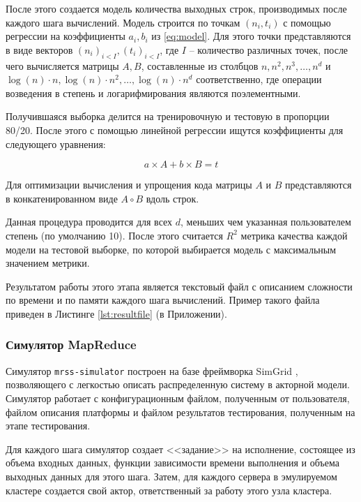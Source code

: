 \documentclass[../diploma.tex]{subfile}
\begin{document}
    После этого создается модель количества выходных строк, производимых после
    каждого шага вычислений. Модель строится по точкам $(n_i, t_i)$ с помощью
    регрессии на коэффициенты $a_i, b_i$ из \ref{eq:model}. Для этого точки
    представляются в виде векторов $(n_i)_{i < I}, (t_i)_{i < I}$, где $I$ --
    количество различных точек, после чего вычисляется матрицы $A, B$, составленные из
    столбцов $n, n^2, n^3, \ldots, n^d$ и $\log(n)\cdot n, \log(n)\cdot n^2,
    \ldots, \log(n)\cdot n^d$ соответственно, где операции возведения в степень и
    логарифмирования являются поэлементными.

    Получившаяся выборка делится на тренировочную и тестовую в пропорции 80/20.
    После этого с помощью линейной регрессии ищутся коэффициенты для следующего
    уравнения:
    
    \begin{equation}
        a\times A + b \times B = t
    \end{equation}

    Для оптимизации вычисления и упрощения кода матрицы $A$ и $B$ представляются
    в конкатенированном виде $A\circ B$ вдоль строк. 

    Данная процедура проводится для всех $d$, меньших чем указанная
    пользователем степень (по умолчанию 10). После этого считается $R^2$ метрика
    качества каждой модели на тестовой выборке, по которой выбирается модель с
    максимальным значением метрики. 

    Результатом работы этого этапа является текстовый файл с описанием сложности
    по времени и по памяти каждого шага вычислений. Пример такого файла приведен
    в Листинге \ref{lst:resultfile} (в Приложении).

    \subsubsection{Симулятор MapReduce}
    
    Симулятор {\tt mrss-simulator} построен на базе фреймворка SimGrid
    \cite{simgrid}\cite{simgrid_paper}, позволяющего с легкостью описать
    распределенную систему в акторной модели. Симулятор работает с
    конфигурационным файлом, полученным от пользователя, файлом описания
    платформы и файлом результатов тестирования, полученным на этапе
    тестирования. 

    Для каждого шага симулятор создает <<задание>> на исполнение, состоящее из
    объема входных данных, функции зависимости времени выполнения и объема
    выходных данных для этого шага. Затем, для каждого сервера в эмулируемом
    кластере создается свой актор, ответственный за работу этого узла кластера.
\end{document}

